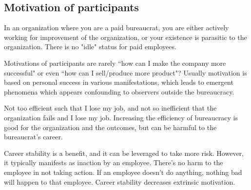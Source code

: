 \subsection{Motivation of participants}


In an organization where you are a paid bureaucrat, you are either actively working for improvement of the organization, or your existence is parasitic to the organization. There is no "idle" status for paid employees.

Motivations of participants are rarely ``how can I make the company more successful" or even ``how can I sell/produce more product"? Usually motivation is based on personal success in various manifestations, which leads to emergent phenomena which appears confounding to observers outside the bureaucracy. 

Not too efficient such that I lose my job, and not so inefficient that the organization fails and I lose my job. Increasing the efficiency of bureaucracy is good for the organization and the outcomes, but can be harmful to the bureaucrat's career.

Career stability is a benefit, and it can be leveraged to take more risk. However, it typically manifests as inaction by an employee. There's no harm to the employee in not taking action. If an employee doesn't do anything, nothing bad will happen to that employee. Career stability decreases extrinsic motivation.